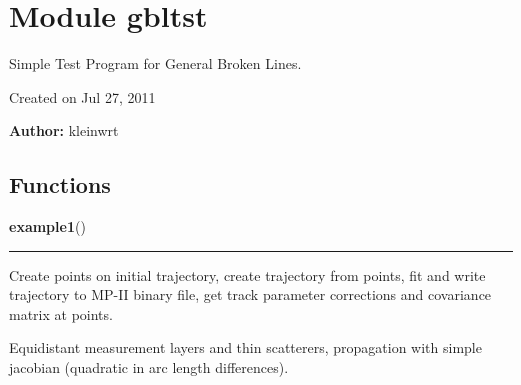 %
%
%


\section{Module gbltst}

    \label{gbltst}
Simple Test Program for General Broken Lines.

Created on Jul 27, 2011

\textbf{Author:} kleinwrt





  \subsection{Functions}

    \label{gbltst:example1}

    \vspace{0.5ex}

\hspace{.8\funcindent}\begin{boxedminipage}{\funcwidth}

    \raggedright \textbf{example1}()

    \vspace{-1.5ex}

    \rule{\textwidth}{0.5\fboxrule}
\setlength{\parskip}{2ex}
    Create points on initial trajectory, create trajectory from points, fit
    and write trajectory to MP-II binary file, get track parameter 
    corrections and covariance matrix at points.

    Equidistant measurement layers and thin scatterers, propagation with 
    simple jacobian (quadratic in arc length differences).

\setlength{\parskip}{1ex}
    \end{boxedminipage}

